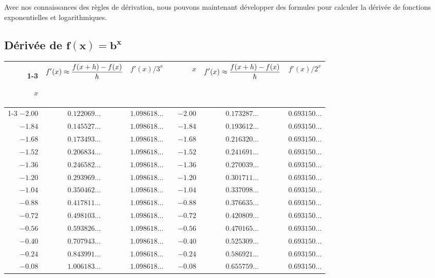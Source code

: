 {Avec nos connaissances des règles de dérivation, nous pouvons maintenant
développer des formules pour calculer la dérivée de fonctions
exponentielles et logarithmiques.

\subsection{Dérivée de $\mathbf{f(x) = b^x}$}\label{SECT_B_EXP}

\begin{table}[t]
{\scriptsize
\begin{center}
\begin{tabular}{r|c|ccr|c|c}
\cline{1-3} \cline{5-7}
\rule[-0.7em]{0ex}{2.5em}
$x$ & $\displaystyle f'(x) \approx \frac{f(x+h)-f(x)}{h}$ & $f'(x)/3^x$ &
\qquad \qquad &
$x$ & $\displaystyle f'(x) \approx \frac{f(x+h)-f(x)}{h}$ & $f'(x)/2^x$
\\[0.8em]
\cline{1-3} \cline{5-7}
$-2.00$ & $0.122069\ldots$ & $1.098618\ldots$ && $-2.00$ & $0.173287\ldots$ & $0.693150\ldots$ \\
$-1.84$ & $0.145527\ldots$ & $1.098618\ldots$ && $-1.84$ & $0.193612\ldots$ & $0.693150\ldots$ \\  
$-1.68$ & $0.173493\ldots$ & $1.098618\ldots$ && $-1.68$ & $0.216320\ldots$ & $0.693150\ldots$ \\ 
$-1.52$ & $0.206834\ldots$ & $1.098618\ldots$ && $-1.52$ & $0.241691\ldots$ & $0.693150\ldots$ \\
$-1.36$ & $0.246582\ldots$ & $1.098618\ldots$ && $-1.36$ & $0.270039\ldots$ & $0.693150\ldots$ \\
$-1.20$ & $0.293969\ldots$ & $1.098618\ldots$ && $-1.20$ & $0.301711\ldots$ & $0.693150\ldots$ \\
$-1.04$ & $0.350462\ldots$ & $1.098618\ldots$ && $-1.04$ & $0.337098\ldots$ & $0.693150\ldots$ \\
$-0.88$ & $0.417811\ldots$ & $1.098618\ldots$ && $-0.88$ & $0.376635\ldots$ & $0.693150\ldots$ \\
$-0.72$ & $0.498103\ldots$ & $1.098618\ldots$ && $-0.72$ & $0.420809\ldots$ & $0.693150\ldots$ \\
$-0.56$ & $0.593826\ldots$ & $1.098618\ldots$ && $-0.56$ & $0.470165\ldots$ & $0.693150\ldots$ \\
$-0.40$ & $0.707943\ldots$ & $1.098618\ldots$ && $-0.40$ & $0.525309\ldots$ & $0.693150\ldots$ \\
$-0.24$ & $0.843991\ldots$ & $1.098618\ldots$ && $-0.24$ & $0.586921\ldots$ & $0.693150\ldots$ \\
$-0.08$ & $1.006183\ldots$ & $1.098618\ldots$ && $-0.08$ & $0.655759\ldots$ & $0.693150\ldots$ \\

\end{tabular}
\end{center}}
\end{table}}
